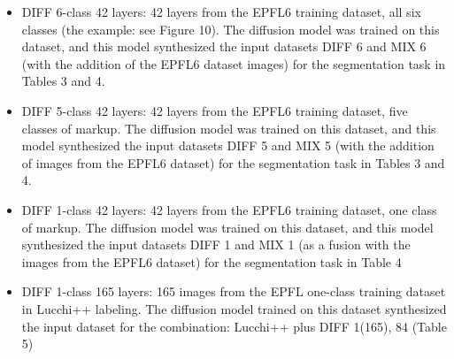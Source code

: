 \documentclass[journal,article,submit,pdftex,moreauthors]{Definitions/mdpi}
\begin{document}
\begin{itemize}
	\item {DIFF 6-class 42 layers: 42 layers from the EPFL6 training dataset, all six classes (the example: see Figure 10). The diffusion model was trained on this dataset, and this model synthesized the input datasets DIFF 6 and MIX 6 (with the addition of the EPFL6 dataset images) for the segmentation task in Tables 3 and 4.}
	\item {DIFF 5-class 42 layers: 42 layers from the EPFL6 training dataset, five classes of markup. The diffusion model was trained on this dataset, and this model synthesized the input datasets DIFF 5 and MIX 5 (with the addition of images from the EPFL6 dataset) for the segmentation task in Tables 3 and 4.}
	\item {DIFF 1-class 42 layers: 42 layers from the EPFL6 training dataset, one class of markup. The diffusion model was trained on this dataset, and this model synthesized the input datasets DIFF 1 and MIX 1 (as a fusion with the images from the EPFL6 dataset) for the segmentation task in Table 4}
	\item {DIFF 1-class 165 layers: 165 images from the EPFL one-class training dataset in Lucchi++ labeling. The diffusion model trained on this dataset synthesized the input dataset for the combination: Lucchi++ plus DIFF 1(165), 84 (Table 5)}
\end{itemize}
\end{document}
